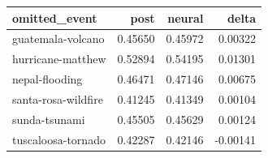 \begin{tabular}{lrrr}
\toprule
omitted\_event & post & neural & delta \\
\midrule
guatemala-volcano & 0.45650 & 0.45972 & 0.00322 \\
hurricane-matthew & 0.52894 & 0.54195 & 0.01301 \\
nepal-flooding & 0.46471 & 0.47146 & 0.00675 \\
santa-rosa-wildfire & 0.41245 & 0.41349 & 0.00104 \\
sunda-tsunami & 0.45505 & 0.45629 & 0.00124 \\
tuscaloosa-tornado & 0.42287 & 0.42146 & -0.00141 \\
\bottomrule
\end{tabular}
